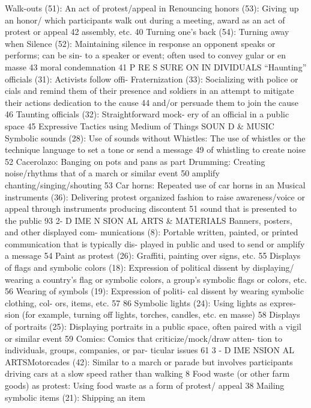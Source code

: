 \documentclass[twoside,a4paper,12pt,fleqn,openany]{extbook}
\begin{document}
Walk-outs (51): An act of protest/appeal in
 Renouncing honors (53): Giving up an honor/
which participants walk out during a meeting,
 award as an act of protest or appeal
 42
assembly, etc.
 40
Turning one’s back (54): Turning away when
Silence (52): Maintaining silence in response
 an opponent speaks or performs; can be sin-
to a speaker or event; often used to convey
 gular or en masse
 43
moral condemnation
 41
P RE S SURE ON IN DIVIDUALS
“Haunting” officials (31): Activists follow offi-
 Fraternization (33): Socializing with police or
cials and remind them of their presence and
 soldiers in an attempt to mitigate their actions
dedication to the cause
 44
 and/or persuade them to join the cause 46
Taunting officials (32): Straightforward mock-
ery of an official in a public space
 45
Expressive Tactics using Medium of Things
SOUN D & MUSIC
Symbolic sounds (28): Use of sounds without
 Whistles: The use of whistles or the technique
language to set a tone or send a message 49
 of whistling to create noise
 52
Cacerolazo: Banging on pots and pans as part
 Drumming: Creating noise/rhythms that
of a march or similar event
 50
 amplify chanting/singing/shouting
 53
Car horns: Repeated use of car horns in an
 Musical instruments (36): Delivering protest
organized fashion to raise awareness/voice
 or appeal through instruments producing
discontent
 51
 sound that is presented to the public
 93
2- D IME N SION AL ARTS & MATERIALS
Banners, posters, and other displayed com-
munications (8): Portable written, painted, or
printed communication that is typically dis-
played in public and used to send or amplify a
message
 54
Paint as protest (26): Graffiti, painting over
signs, etc.
 55
Displays of flags and symbolic colors (18):
Expression of political dissent by displaying/
wearing a country’s flag or symbolic colors, a
group’s symbolic flags or colors, etc.
 56
Wearing of symbols (19): Expression of politi-
cal dissent by wearing symbolic clothing, col-
ors, items, etc.
 57
86
Symbolic lights (24): Using lights as expres-
sion (for example, turning off lights, torches,
candles, etc. en masse)
 58
Displays of portraits (25): Displaying portraits
in a public space, often paired with a vigil or
similar event
 59
Comics: Comics that criticize/mock/draw atten-
tion to individuals, groups, companies, or par-
ticular issues
 61
3 - D IME NSION AL ARTSMotorcades (42): Similar to a march or parade
but involves participants driving cars at a slow
speed rather than walking
 8
Food waste (or other farm goods) as protest:
Using food waste as a form of protest/
appeal
 38
Mailing symbolic items (21): Shipping an item
\end{document}
